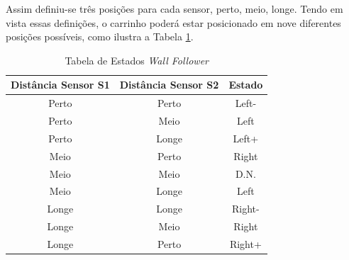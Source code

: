   Assim definiu-se três posições para cada sensor, perto, meio, longe. Tendo em vista essas definições, o carrinho poderá estar posicionado em nove diferentes posições possíveis, como ilustra a Tabela \ref{tab:state_wall_follower}.

  \begin{table}[!htbp]
  \centering
  \caption{Tabela de Estados \textit{Wall Follower}}
  \label{tab:state_wall_follower}
  \begin{tabular}{|c|c|c|}
  \hline
  Distância Sensor S1 & Distância Sensor S2 & Estado \\ \hline
  Perto               & Perto                & Left- \\ \hline
  Perto               & Meio                 & Left  \\ \hline
  Perto               & Longe                & Left+ \\ \hline
  Meio                & Perto               & Right  \\ \hline
  Meio                & Meio                & D.N.   \\ \hline
  Meio                & Longe               & Left   \\ \hline
  Longe               & Longe               & Right- \\ \hline
  Longe               & Meio                & Right  \\ \hline
  Longe               & Perto              & Right+  \\ \hline
  \end{tabular}
  \end{table}

